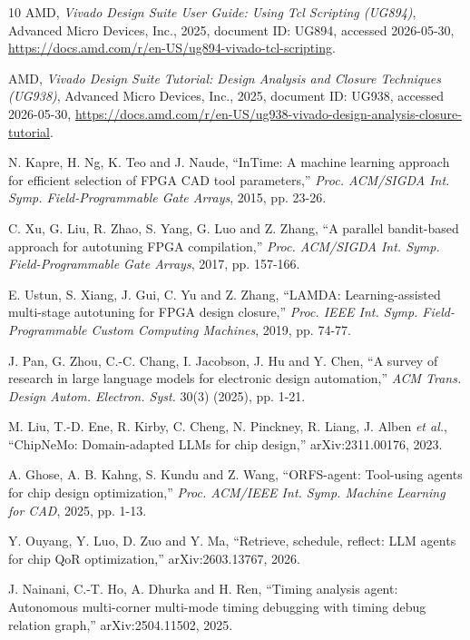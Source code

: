 \documentclass[conference]{IEEEtran}
\begin{document}
\begin{thebibliography}{10}
{AMD}, {\em Vivado Design Suite User Guide: Using Tcl Scripting
(UG894)}, Advanced Micro Devices, Inc., 2025, document ID: UG894,
accessed 2026-05-30,
\url{https://docs.amd.com/r/en-US/ug894-vivado-tcl-scripting}.

{AMD}, {\em Vivado Design Suite Tutorial: Design Analysis and Closure
Techniques (UG938)}, Advanced Micro Devices, Inc., 2025, document ID:
UG938, accessed 2026-05-30,
\url{https://docs.amd.com/r/en-US/ug938-vivado-design-analysis-closure-tutorial}.

N. Kapre, H. Ng, K. Teo and J. Naude, ``{InTime}: A machine learning
approach for efficient selection of {FPGA} {CAD} tool parameters,''
{\em Proc. ACM/SIGDA Int. Symp. Field-Programmable Gate Arrays}, 2015,
pp. 23-26.

C. Xu, G. Liu, R. Zhao, S. Yang, G. Luo and Z. Zhang, ``A parallel
bandit-based approach for autotuning {FPGA} compilation,'' {\em Proc.
ACM/SIGDA Int. Symp. Field-Programmable Gate Arrays}, 2017,
pp. 157-166.

E. Ustun, S. Xiang, J. Gui, C. Yu and Z. Zhang, ``{LAMDA}:
Learning-assisted multi-stage autotuning for {FPGA} design closure,''
{\em Proc. IEEE Int. Symp. Field-Programmable Custom Computing
Machines}, 2019, pp. 74-77.

J. Pan, G. Zhou, C.-C. Chang, I. Jacobson, J. Hu and Y. Chen, ``A survey
of research in large language models for electronic design automation,''
{\em ACM Trans. Design Autom. Electron. Syst.} 30(3) (2025), pp. 1-21.

M. Liu, T.-D. Ene, R. Kirby, C. Cheng, N. Pinckney, R. Liang, J. Alben
{\em et al.}, ``{ChipNeMo}: Domain-adapted {LLMs} for chip design,''
arXiv:2311.00176, 2023.

A. Ghose, A. B. Kahng, S. Kundu and Z. Wang, ``{ORFS-agent}: Tool-using
agents for chip design optimization,'' {\em Proc. ACM/IEEE Int. Symp.
Machine Learning for CAD}, 2025, pp. 1-13.

Y. Ouyang, Y. Luo, D. Zuo and Y. Ma, ``Retrieve, schedule, reflect:
{LLM} agents for chip {QoR} optimization,'' arXiv:2603.13767, 2026.

J. Nainani, C.-T. Ho, A. Dhurka and H. Ren, ``Timing analysis agent:
Autonomous multi-corner multi-mode timing debugging with timing debug
relation graph,'' arXiv:2504.11502, 2025.


\end{thebibliography}
\end{document}
